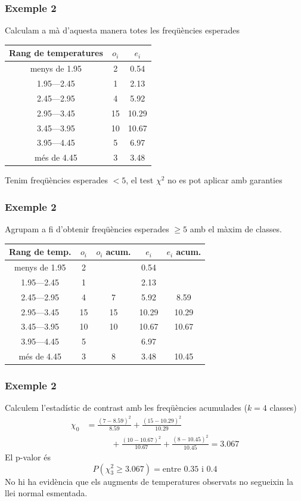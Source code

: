 \documentclass[12pt,t]{beamer}
\renewcommand{\emph}[1]{{\color{red}#1}}
\renewcommand{\geq}{\geqslant}
\theoremstyle{plain}
\theoremstyle{definition}
\begin{document}
\begin{frame}
\frametitle{Exemple 2}
Calculam \emph{a mà} d'aquesta manera totes les freqüències esperades
\begin{center}
\begin{tabular}{|c|c|c|}
\hline
Rang de temperatures & $o_i$ & $e_i$
\\
\hline
menys de 1.95 & 2 &  0.54 \\
1.95---2.45 & 1 & 2.13 \\
2.45---2.95 & 4  & 5.92 \\
2.95---3.45 & 15 & 10.29 \\
3.45---3.95 & 10 & 10.67  \\
3.95---4.45 & 5 & 6.97 \\
més de 4.45 & 3  & 3.48\\\hline
\end{tabular}
\end{center}
Tenim freqüències esperades $<5$, el test $\chi^2$ no es pot aplicar amb garanties

\end{frame}

\begin{frame}
\frametitle{Exemple 2}
Agrupam a fi d'obtenir freqüències esperades $\geq 5$ amb el màxim de classes.
\begin{center}
\begin{tabular}{|c|c|c|c|c|}
\hline
Rang de temp. & $o_i$ & $o_i$ acum. & $e_i$ & $e_i$ acum.
\\
\hline
menys de 1.95 & 2 & & 0.54&  \\
1.95---2.45 & 1 &     &2.13 &  \\
2.45---2.95 & 4  & 7&5.92 & 8.59\\
2.95---3.45 & 15 & 15 &10.29&10.29 \\
3.45---3.95 & 10 & 10 &10.67 &10.67  \\
3.95---4.45 & 5 & &6.97 &\\
més de 4.45 & 3  & 8 & 3.48 & 10.45\\
\hline
\end{tabular}
\end{center}
\end{frame}

\begin{frame}
\frametitle{Exemple 2}
Calculem l'estadístic de contrast amb les freqüències acumulades ($k=4$ classes)
$$
\begin{array}{rl} 
\chi_{0} &\displaystyle=\frac{(7-8.59)^2}{8.59}+\frac{(15-10.29)^2}{10.29}\\[2ex]
&\displaystyle\qquad\quad +\frac{(10-10.67)^2}{10.67}+\frac{(8-10.45)^2}{10.45}=3.067
\end{array}
$$
El p-valor és
$$
P(\chi_{3}^2\geq 3.067)=\mbox{entre 0.35 i 0.4}
$$
No hi ha evidència que els augments de temperatures observats no segueixin la llei normal esmentada.

\end{frame}
\end{document}
